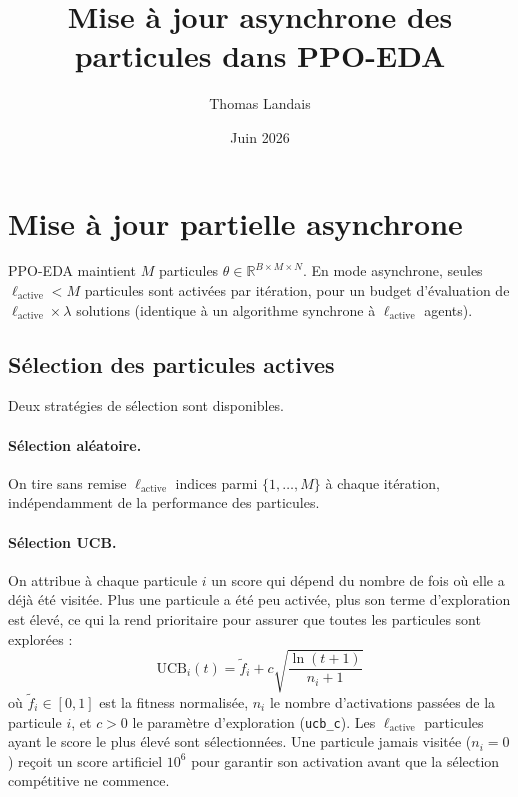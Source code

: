 \documentclass{article}
\title{Mise à jour asynchrone des particules dans PPO-EDA}
\author{Thomas Landais}
\date{Juin 2026}
\begin{document}
\maketitle

\section{Mise à jour partielle asynchrone}

PPO-EDA maintient $M$ particules $\theta \in \mathbb{R}^{B \times M \times N}$.
En mode asynchrone, seules $\ell_{\mathrm{active}} < M$ particules sont activées par itération,
pour un budget d'évaluation de $\ell_{\mathrm{active}} \times \lambda$ solutions (identique
à un algorithme synchrone à $\ell_{\mathrm{active}}$ agents).

\subsection{Sélection des particules actives}

Deux stratégies de sélection sont disponibles.

\paragraph{Sélection aléatoire.}
On tire sans remise $\ell_{\mathrm{active}}$ indices parmi $\{1,\ldots,M\}$ à chaque itération,
indépendamment de la performance des particules.

\paragraph{Sélection UCB.}
On attribue à chaque particule $i$ un score qui dépend du nombre de fois où elle a déjà
été visitée. Plus une particule a été peu activée, plus son terme d'exploration est élevé,
ce qui la rend prioritaire pour assurer que toutes les particules sont explorées :
\begin{equation}
  \mathrm{UCB}_{i}(t) = \tilde{f}_{i} + c \sqrt{\frac{\ln(t+1)}{n_{i} + 1}}
\end{equation}
où $\tilde{f}_i \in [0,1]$ est la fitness normalisée, $n_i$ le nombre d'activations passées
de la particule $i$, et $c > 0$ le paramètre d'exploration (\texttt{ucb\_c}).
Les $\ell_{\mathrm{active}}$ particules ayant le score le plus élevé sont sélectionnées.
Une particule jamais visitée ($n_i = 0$) reçoit un score artificiel $10^6$ pour
garantir son activation avant que la sélection compétitive ne commence.
\end{document}
